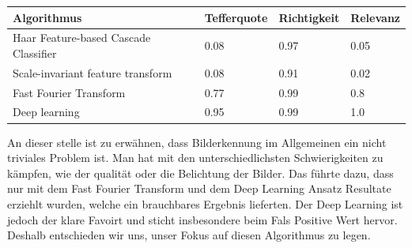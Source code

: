 \begin{center}
    \begin{tabular}{ | p{3cm} | p{3cm}  | p{3cm} | p{3cm}  | }
    \hline    
    \rowcolor{lightblue}
	Algorithmus & Tefferquote & Richtigkeit & Relevanz \\ \hline
	Haar Feature-based Cascade Classifier & 0.08 & 0.97 & 0.05 \\ \hline
	Scale-invariant feature transform & 0.08 & 0.91 & 0.02 \\ \hline
	Fast Fourier Transform & 0.77 & 0.99 & 0.8 \\ \hline
	Deep learning & 0.95 & 0.99 & 1.0 \\ \hline
    \end{tabular}
\end{center}

An dieser stelle ist zu erwähnen, dass Bilderkennung im Allgemeinen ein nicht triviales Problem ist. Man hat mit den unterschiedlichsten Schwierigkeiten zu kämpfen, wie der qualität oder die Belichtung der Bilder. Das führte dazu, dass nur mit dem Fast Fourier Transform und dem Deep Learning Ansatz Resultate erziehlt wurden, welche ein brauchbares Ergebnis lieferten. Der Deep Learning ist jedoch der klare Favoirt und sticht insbesondere beim Fals Positive Wert hervor. Deshalb entschieden wir uns, unser Fokus auf diesen Algorithmus zu legen. 



